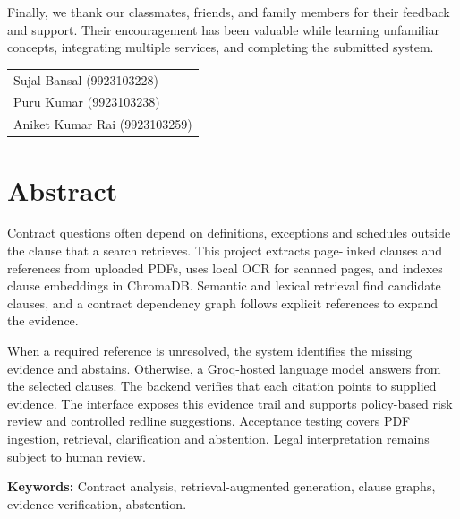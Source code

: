\documentclass[12pt,a4paper,oneside]{report}
\newcommand{\studentone}{Sujal Bansal (9923103228)}
\newcommand{\studenttwo}{Puru Kumar (9923103238)}
\newcommand{\studentthree}{Aniket Kumar Rai (9923103259)}
\begin{document}
Finally, we thank our classmates, friends, and family members for their feedback and support. Their encouragement has been valuable while learning unfamiliar concepts, integrating multiple services, and completing the submitted system.

\vfill
\begin{tabular}{l}
\studentone\\
\studenttwo\\
\studentthree
\end{tabular}

\clearpage
\chapter*{Abstract}
Contract questions often depend on definitions, exceptions and schedules outside the clause that a search retrieves. This project extracts page-linked clauses and references from uploaded PDFs, uses local OCR for scanned pages, and indexes clause embeddings in ChromaDB. Semantic and lexical retrieval find candidate clauses, and a contract dependency graph follows explicit references to expand the evidence.

When a required reference is unresolved, the system identifies the missing evidence and abstains. Otherwise, a Groq-hosted language model answers from the selected clauses. The backend verifies that each citation points to supplied evidence. The interface exposes this evidence trail and supports policy-based risk review and controlled redline suggestions. Acceptance testing covers PDF ingestion, retrieval, clarification and abstention. Legal interpretation remains subject to human review.

\textbf{Keywords:} Contract analysis, retrieval-augmented generation, clause graphs, evidence verification, abstention.

\clearpage

\clearpage
\tableofcontents
\clearpage
\listoffigures
{}
\clearpage

\listoftables
{}
\clearpage
\end{document}
